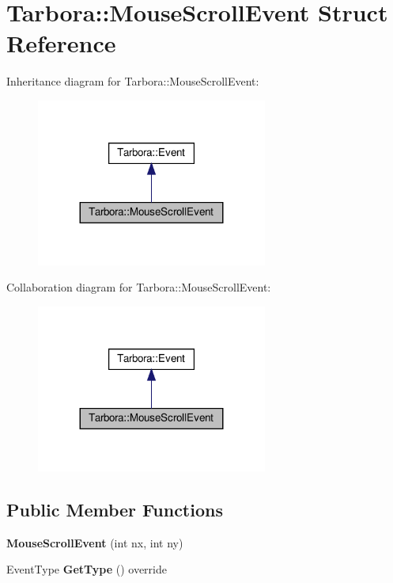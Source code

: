 \hypertarget{structTarbora_1_1MouseScrollEvent}{}\section{Tarbora\+:\+:Mouse\+Scroll\+Event Struct Reference}
\label{structTarbora_1_1MouseScrollEvent}


Inheritance diagram for Tarbora\+:\+:Mouse\+Scroll\+Event\+:\nopagebreak
\begin{figure}[H]
\begin{center}
\leavevmode
\includegraphics[width=215pt]{structTarbora_1_1MouseScrollEvent__inherit__graph}
\end{center}
\end{figure}


Collaboration diagram for Tarbora\+:\+:Mouse\+Scroll\+Event\+:\nopagebreak
\begin{figure}[H]
\begin{center}
\leavevmode
\includegraphics[width=215pt]{structTarbora_1_1MouseScrollEvent__coll__graph}
\end{center}
\end{figure}
\subsection*{Public Member Functions}
\begin{DoxyCompactItemize}
\item 
\mbox{\label{structTarbora_1_1MouseScrollEvent_a6e105582b91c6eec42e691b372b3cd69}} 
{\bfseries Mouse\+Scroll\+Event} (int nx, int ny)
\item 
\mbox{\label{structTarbora_1_1MouseScrollEvent_a66629a70d3171f706e81c7ff1e18abde}} 
Event\+Type {\bfseries Get\+Type} () override
\end{DoxyCompactItemize}
